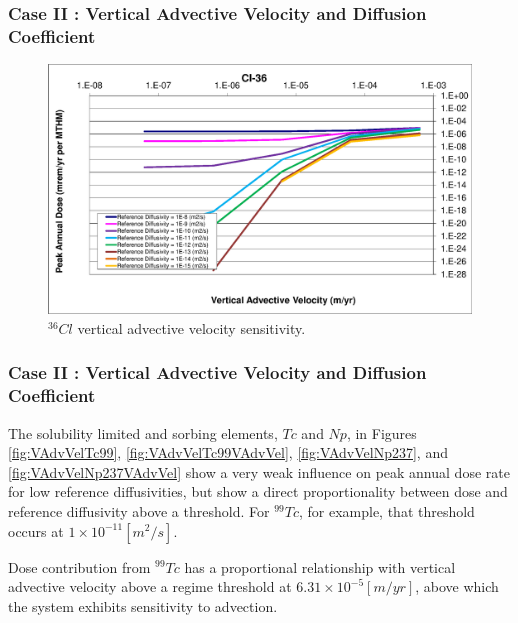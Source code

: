 \begin{frame}[c]
  \frametitle{Case II : Vertical Advective Velocity and Diffusion Coefficient}
\begin{figure}[ht!]
\centering
\includegraphics[width=\textwidth]{AdvVelAndDiffCoeffEBSFail/Cl-36-VAdvVel.eps}
\caption{$^{36}Cl$ vertical advective velocity sensitivity.}
\label{fig:VAdvVelCl36VAdvVel}
\end{figure}
\end{frame}

\begin{frame}[c]
  \frametitle{Case II : Vertical Advective Velocity and Diffusion Coefficient}
The solubility limited and sorbing elements, $Tc$ and $Np$, in Figures 
\ref{fig:VAdvVelTc99}, \ref{fig:VAdvVelTc99VAdvVel}, \ref{fig:VAdvVelNp237}, and 
\ref{fig:VAdvVelNp237VAdvVel} show a very weak influence on peak annual dose 
rate for low reference diffusivities, but show a direct proportionality between 
dose and reference diffusivity above a threshold. For $^{99}Tc$, for example, 
that threshold occurs at $1\times10^{-11}[m^2/s]$. 


Dose contribution from $^{99}Tc$ has a proportional 
relationship with vertical advective velocity above a regime threshold at 
$6.31\times10^{-5}[m/yr]$, above which the system exhibits sensitivity to 
advection. 

\end{frame}

